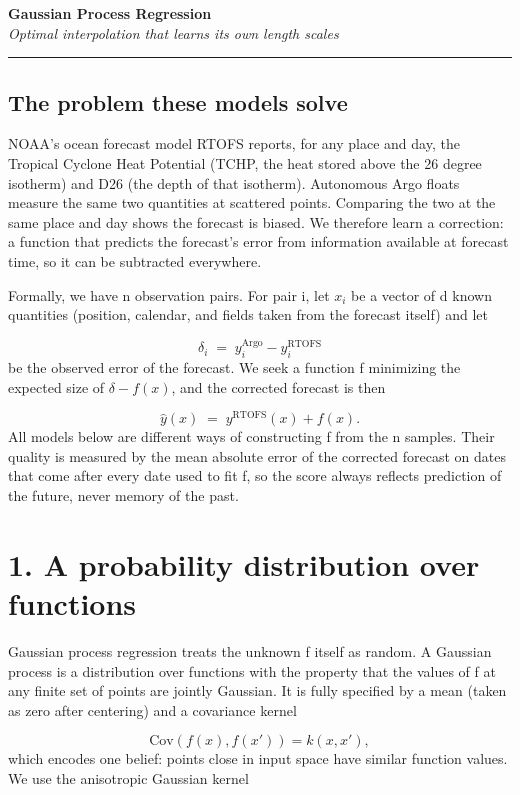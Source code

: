 \documentclass[11pt]{article}
\begin{document}
{\huge\bfseries Gaussian Process Regression}\\[2.5mm]
{\large\itshape Optimal interpolation that learns its own length scales}\\[2mm]
\hrule\vspace{5mm}

\subsection*{The problem these models solve}
NOAA's ocean forecast model RTOFS reports, for any place and day, the Tropical Cyclone Heat Potential (TCHP, the heat stored above the 26 degree isotherm) and D26 (the depth of that isotherm). Autonomous Argo floats measure the same two quantities at scattered points. Comparing the two at the same place and day shows the forecast is biased. We therefore learn a correction: a function that predicts the forecast's error from information available at forecast time, so it can be subtracted everywhere.

Formally, we have n observation pairs. For pair i, let $x_i$ be a vector of d known quantities (position, calendar, and fields taken from the forecast itself) and let

\[ \delta_i \;=\; y_i^{\mathrm{Argo}} - y_i^{\mathrm{RTOFS}} \]
be the observed error of the forecast. We seek a function f minimizing the expected size of $\delta-f(x)$, and the corrected forecast is then

\[ \hat{y}(x) \;=\; y^{\mathrm{RTOFS}}(x) + f(x). \]
All models below are different ways of constructing f from the n samples. Their quality is measured by the mean absolute error of the corrected forecast on dates that come after every date used to fit f, so the score always reflects prediction of the future, never memory of the past.

\section*{1. A probability distribution over functions}
Gaussian process regression treats the unknown f itself as random. A Gaussian process is a distribution over functions with the property that the values of f at any finite set of points are jointly Gaussian. It is fully specified by a mean (taken as zero after centering) and a covariance kernel

\[ \mathrm{Cov}(f(x), f(x')) = k(x, x'), \]
which encodes one belief: points close in input space have similar function values. We use the anisotropic Gaussian kernel
\end{document}
